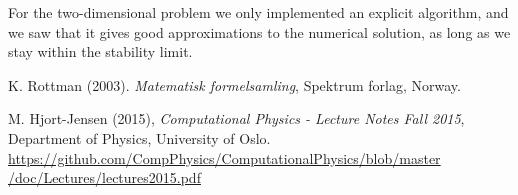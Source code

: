 \documentclass[12pt, a4paper]{article}
\begin{document}
For the two-dimensional problem we only implemented an explicit algorithm, and we saw that it gives 
good approximations to the numerical solution, as long as we stay within the stability limit.  

\begin{thebibliography}{40}

 K. Rottman (2003). \textit{Matematisk formelsamling}, Spektrum forlag, Norway. 

 M. Hjort-Jensen (2015), \textit{Computational Physics - Lecture Notes Fall 2015}, 
Department of Physics, University of Oslo. \\ 
\href{https://github.com/CompPhysics/ComputationalPhysics/blob/master/doc/Lectures/lectures2015.pdf}
{https://github.com/CompPhysics/ComputationalPhysics/blob/master\\/doc/Lectures/lectures2015.pdf}

\end{thebibliography}
\end{document}
